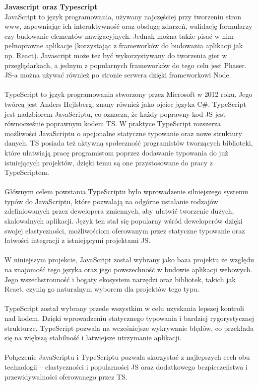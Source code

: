 \documentclass[twoside]{projektInzynierskiMS1}
\begin{document}
\noindent \textbf{Javascript oraz Typescript}\\
JavaScript to język programowania, używany najczęściej przy tworzeniu stron www, zapewniając ich interaktywność oraz obsługę zdarzeń, walidację formularzy czy budowanie elementów nawigacyjnych. Jednak można także pisać w nim pełnoprawne aplikacje (korzystając z frameworków do budowania aplikacji jak np. React). Javascript może też być wykorzystywany do tworzenia gier w przeglądarkach, a jednym z popularnych frameworków do tego celu jest Phaser. JS-a można używać również po stronie serwera dzięki frameworkowi Node.
\\\\
TypeScript to język programowania stworzony przez Microsoft w 2012 roku. Jego twórcą jest Anders Hejlsberg, znany również jako ojciec języka C\#. TypeScript jest nadzbiorem JavaScriptu, co oznacza, że każdy poprawny kod JS jest równocześnie poprawnym kodem TS. W praktyce TypeScript rozszerza możliwości JavaScriptu o opcjonalne statyczne typowanie oraz nowe struktury danych. TS posiada też aktywną społeczność programistów tworzących biblioteki, które ułatwiają pracę programistom poprzez dodawanie typowania do już istniejących projektów, dzięki temu są one przystosowane do pracy z TypeScriptem.
\\\\
Głównym celem powstania TypeScriptu było wprowadzenie silniejszego systemu typów do JavaScriptu, które pozwalają na odgórne ustalanie rodzajów zdefiniowanych przez dewelopera zmiennych, aby ułatwić tworzenie dużych, skalowalnych aplikacji. Język ten stał się popularny wśród deweloperów dzięki swojej elastyczności, możliwościom oferowanym przez statyczne typowanie oraz łatwości integracji z istniejącymi projektami JS.
\\\\
W niniejszym projekcie, JavaScript został wybrany jako baza projektu ze względu na znajomość tego języka oraz jego powszechność w budowie aplikacji webowych. Jego wszechstronność i bogaty ekosystem narzędzi oraz bibliotek, takich jak React, czynią go naturalnym wyborem dla projektów tego typu.
\\\\
TypeScript został wybrany przede wszystkim w celu uzyskania lepszej kontroli nad kodem. Dzięki wprowadzeniu statycznego typowania i bardziej rygorystycznej strukturze, TypeScript pozwala na wcześniejsze wykrywanie błędów, co przekłada się na większą stabilność i łatwiejsze utrzymanie aplikacji.
\\\\
Połączenie JavaScriptu i TypeScriptu pozwala skorzystać z najlepszych cech obu technologii – elastyczności i popularności JS oraz dodatkowego bezpieczeństwa i przewidywalności oferowanego przez TS.
\\\\
\end{document}

